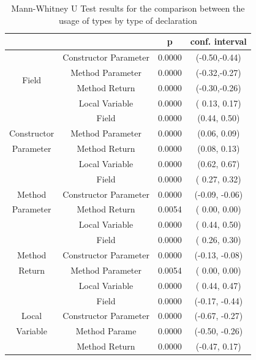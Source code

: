 \documentclass[preprint]{sigplanconf}
\renewcommand{\arraystretch}{1.2}
\begin{document}
\begin{table}[ht]

\centering{}%
\renewcommand{\arraystretch}{1.2}

\begin{tabular}{|c|c|c|c|}
\hline 
								& {}					& p  	      & conf. interval\\
\hline
\hline
\multirow{4}{*}{Field}			& Constructor Parameter	& 0.0000 & (-0.50,-0.44)\\
								& Method Parameter		& 0.0000 & (-0.32,-0.27)\\
								& Method Return			& 0.0000 & (-0.30,-0.26)\\
								& Local Variable 		& 0.0000 & ( 0.13, 0.17)\\
\hline
{}								& Field					& 0.0000 & (0.44, 0.50)	\\
Constructor						& Method Parameter		& 0.0000 & (0.06, 0.09)	\\
Parameter						& Method Return			& 0.0000 & (0.08, 0.13)	\\
{}								& Local Variable		& 0.0000 & (0.62, 0.67)	\\
\hline
{}								& Field					& 0.0000 & ( 0.27,  0.32)	\\
Method							& Constructor Parameter	& 0.0000 & (-0.09, -0.06)	\\
Parameter						& Method Return			& 0.0054 & ( 0.00,  0.00)	\\
{}								& Local Variable		& 0.0000 & ( 0.44,  0.50)	\\
\hline
{}								& Field					& 0.0000 & ( 0.26,  0.30)	\\
Method							& Constructor Parameter	& 0.0000 & (-0.13, -0.08)	\\
Return							& Method Parameter		& 0.0054 & ( 0.00,  0.00)	\\
{}								& Local Variable		& 0.0000 & ( 0.44,  0.47)	\\
\hline
{}								& Field					& 0.0000 & (-0.17, -0.44) \\
Local							& Constructor Parameter	& 0.0000 & (-0.67, -0.27) \\
Variable						& Method Parame			& 0.0000 & (-0.50, -0.26) \\
{}								& Method Return			& 0.0000 & (-0.47,  0.17) \\
\hline  
\end{tabular}
\label{tab:all_utest_type}
\caption{Mann-Whitney U Test results for the comparison between the usage of types by type of declaration}
\end{table}
\end{document}
